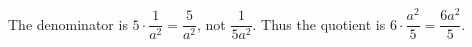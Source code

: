 The denominator is $5\cdot\dfrac{1}{a^2}=\dfrac{5}{a^2}$, not $\dfrac{1}{5a^2}$. Thus the quotient is $6\cdot\dfrac{a^2}{5}=\boxed{\dfrac{6a^2}{5}}$.
